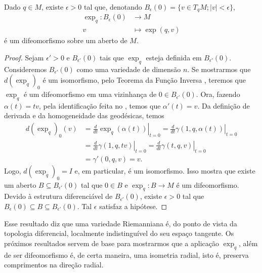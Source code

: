 \begin{proposition}
    \label{prop:exp-difeomorfismo}
    Dado $q \in M$, existe $\epsilon>0$ tal que, denotando $B_{\epsilon}(0)=\{ v \in T_{q}M; |v|<\epsilon \}$,
    \begin{align*}
        \exp _{q}: B_{\epsilon}(0) & \longrightarrow M     \\
        v                          & \longmapsto \exp(q,v)
    \end{align*}
    é um difeomorfismo sobre um aberto de $M$.
    \begin{proof}

        Sejam $\epsilon'>0$ e $B_{\epsilon'}(0)$ tais que $\exp_{q}$ esteja definida em $B_{\epsilon'}(0)$. Consideremos $B_{\epsilon'}(0)$ como uma variedade de dimensão $n$. Se mostrarmos que $d(\exp _{q})_{0}$ é um isomorfismo, pelo Teorema da Função Inversa \parencite[p.~11, teo.~2.10]{doCarmo1992}, teremos que $\exp_{q}$ é um difeomorfismo em uma vizinhança de $0 \in B_{\epsilon'}(0)$. Ora, fazendo $\alpha(t)=tv$, pela identificação feita no , temos que $\alpha'(t)=v$. Da definição de derivada e da homogeneidade das geodésicas, temos
        \begin{align*}
            d(\exp_{q})_{0}(v) & =\left.\frac{d}{dt}\exp_{q}(\alpha(t))\right|_{t=0}
            =\left.\frac{d}{dt}\gamma(1,q,\alpha(t))\right|_{t=0}                    \\
                               & =\left.\frac{d}{dt}\gamma(1,q,tv)\right|_{t=0}
            =\left.\frac{d}{dt}\gamma(t,q,v)\right|_{t=0}                            \\
                               & =\gamma'(0,q,v)=v.
        \end{align*}
        Logo, $d(\exp_{q})_{0}=I$ e, em particular, é um isomorfismo. Isso mostra que existe um aberto $B \subseteq B_{\epsilon'}(0)$ tal que $0 \in B$ e $\exp_{q}:B\to M$ é um difeomorfismo.
        Devido à estrutura diferenciável de $B_{\epsilon'}(0)$, existe $\epsilon>0$ tal que $B_{\epsilon}(0)\subseteq B\subseteq B_{\epsilon'}(0)$. Tal $\epsilon$ satisfaz a hipótese.
    \end{proof}
\end{proposition}
Esse resultado diz que uma variedade Riemanniana é, do ponto de vista da topologia diferencial, localmente indistinguível do seu espaço tangente. Os próximos resultados servem de base para mostrarmos que a aplicação $\exp_{q}$, além de ser difeomorfismo é, de certa maneira, uma isometria radial, isto é, preserva comprimentos na direção radial.

